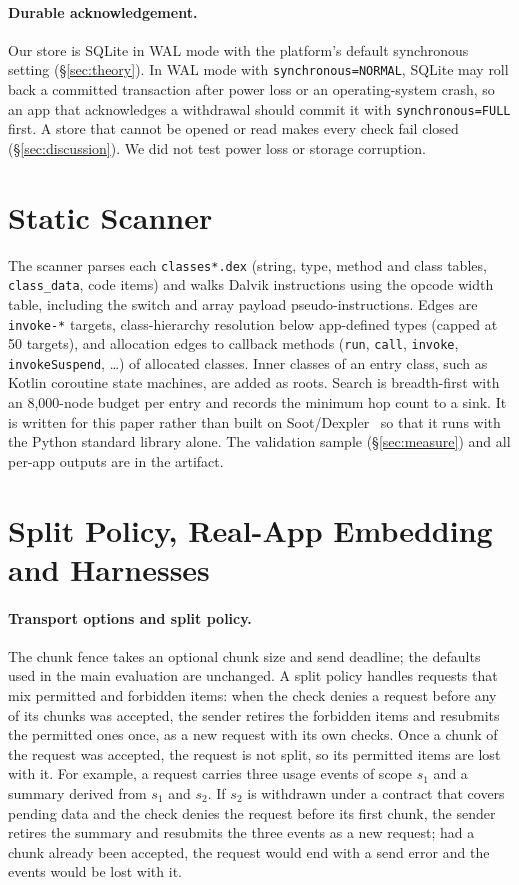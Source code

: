 \paragraph{Durable acknowledgement.} Our store is SQLite in WAL mode with the platform's default synchronous setting
(\S\ref{sec:theory}). In WAL mode with \texttt{synchronous=NORMAL}, SQLite may roll back a committed transaction after
power loss or an operating-system crash, so an app that acknowledges a withdrawal should commit it with \texttt{synchronous=FULL} first. A store that
cannot be opened or read makes every check fail closed (\S\ref{sec:discussion}). We did not test power loss or storage
corruption.

\section{Static Scanner}
\label{app:scanner}

The scanner parses each \texttt{classes*.dex} (string, type, method and class tables, \texttt{class\_data}, code items) and
walks Dalvik instructions using the opcode width table, including the switch and array payload pseudo-instructions. Edges
are \texttt{invoke-*} targets, class-hierarchy resolution below app-defined types (capped at 50 targets), and allocation edges
to callback methods (\texttt{run}, \texttt{call}, \texttt{invoke}, \texttt{invokeSuspend}, \dots) of allocated classes. Inner
classes of an entry class, such as Kotlin coroutine state machines, are added as roots. Search is breadth-first with an 8{,}000-node
budget per entry and records the minimum hop count to a sink. It is written for this paper rather than built on
Soot/Dexpler~\cite{bartel2012dexpler} so that it runs with the Python standard library alone. The validation sample
(\S\ref{sec:measure}) and all per-app outputs are in the artifact.

\section{Split Policy, Real-App Embedding and Harnesses}
\label{app:round3impl}

\paragraph{Transport options and split policy.} The chunk fence takes an optional chunk size and send deadline; the
defaults used in the main evaluation are unchanged. A split policy handles requests that mix permitted and forbidden
items: when the check denies a request before any of its chunks was accepted, the sender retires the forbidden items and
resubmits the permitted ones once, as a new request with its own checks. Once a chunk of the request was accepted, the
request is not split, so its permitted items are lost with it. For example, a request carries three usage events of
scope $s_1$ and a summary derived from $s_1$ and $s_2$. If $s_2$ is withdrawn under a contract that covers pending data
and the check denies the request before its first chunk, the sender retires the summary and resubmits the three events
as a new request; had a chunk already been accepted, the request would end with a send error and the events would be lost
with it.

